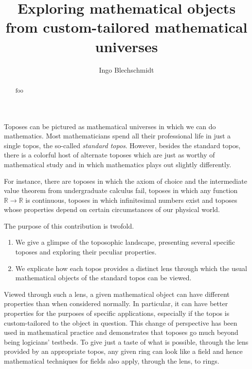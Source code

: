 \documentclass[oneside]{amsart}
\title[]{Exploring mathematical objects from custom-tailored mathematical universes}
\author{Ingo Blechschmidt}
\theoremstyle{definition}
\theoremstyle{plain}
\theoremstyle{remark}
\newcommand{\RR}{\mathbb{R}}
\renewcommand{\_}{\mathpunct{.}\,}
\newcommand{\?}{\,{:}\,}
\begin{document}
\begin{abstract}
  foo
\end{abstract}

\maketitle
\thispagestyle{empty}

\noindent
Toposes can be pictured as mathematical universes in which we can do
mathematics. Most mathematicians spend all their professional life in just a
single topos, the so-called \emph{standard topos}. However, besides the
standard topos, there is a colorful host of alternate toposes which are just as
worthy of mathematical study and in which mathematics plays out slightly
differently.

For instance, there are toposes in which the axiom of choice and the
intermediate value theorem from undergraduate calculus fail, toposes in which
any function~$\RR \to \RR$ is continuous, toposes in which infinitesimal
numbers exist and toposes whose properties depend on certain circumstances of
our physical world.

The purpose of this contribution is twofold.
\begin{enumerate}
\item We give a glimpse of the toposophic landscape, presenting several
specific toposes and exploring their peculiar properties.

\item We explicate how each topos provides a distinct lens through which the
usual mathematical objects of the standard topos can be viewed.
\end{enumerate}

Viewed through such a lens, a given mathematical object can have different
properties than when considered normally. In particular, it can have
better properties for the purposes of specific applications, especially if
the topos is custom-tailored to the object in question. This change of
perspective has been used in mathematical practice and demonstrates that
toposes go much beyond being logicians' testbeds. To give just a taste of what
is possible, through the lens provided by an appropriate topos, any given ring
can look like a field and hence mathematical techniques for fields also apply,
through the lens, to rings.
\end{document}
